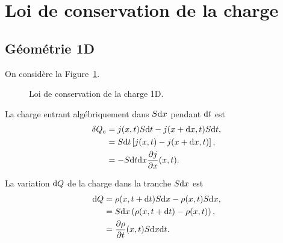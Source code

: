 \section{Loi de conservation de la charge}

    \subsection{Géométrie 1D}

        On considère la Figure~\ref{fig:conservation_charge_1d}.

        \begin{figure}
            \centering
            \caption{Loi de conservation de la charge 1D.}    
            \label{fig:conservation_charge_1d}
        \end{figure}

        La charge entrant algébriquement dans $S\mathrm{d} x$ pendant $\mathrm{d} t$ est 
        \begin{align*}
            \delta Q_e
            &=
            j(x,t)S\mathrm{d} t-j(x+\mathrm{d} x,t)S\mathrm{d} t,\\
            &=
            S\mathrm{d} t\left[
                j(x,t)-j(x+\mathrm{d} x,t)
            \right],\\
            &=-S\mathrm{d} t\mathrm{d} x\frac{\partial j}{\partial x}(x,t).
        \end{align*}

        La variation $\mathrm{d} Q$ de la charge dans la tranche $S\mathrm{d} x$ est 
        \begin{align*}
            \mathrm{d} Q
            &=
            \rho(x,t+\mathrm{d} t)S\mathrm{d} x-\rho(x,t)S\mathrm{d} x,\\
            &=
            S\mathrm{d} x\left(\rho(x,t+\mathrm{d} t)-\rho(x,t)\right),\\
            &=
            \frac{\partial\rho}{\partial t}(x,t)S\mathrm{d} x\mathrm{d} t.
        \end{align*}

